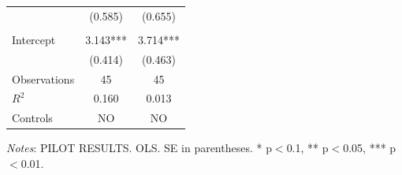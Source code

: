 \documentclass[11pt]{article}
\begin{document}
\begin{table}[!htbp]
\begin{threeparttable}
\begin{tabular}{l|cc}
 & (0.585) & (0.655) \\
\\[0.5em]
Intercept & 3.143*** & 3.714*** \\
 & (0.414) & (0.463) \\
\midrule
Observations & 45 & 45 \\
$R^2$ & 0.160 & 0.013 \\
Controls & NO & NO \\
\bottomrule
\end{tabular}
\begin{tablenotes}[flushleft]
\footnotesize
\item \textit{Notes}: PILOT RESULTS. OLS. SE in parentheses. * p$<$0.1, ** p$<$0.05, *** p$<$0.01.
\end{tablenotes}
\end{threeparttable}
\end{table}
\end{document}
